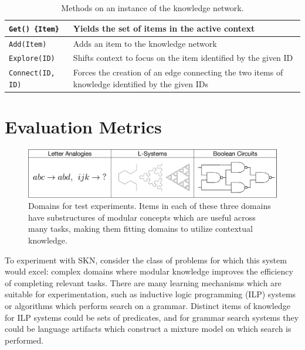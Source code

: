 \documentclass[11pt,letterpaper]{article}
\begin{document}
\begin{table}[h]
  \begin{center}
  \begin{tabular}{|l|p{4in}|}
    \hline
    {\tt Get() \{Item\}}  & Yields the set of items in the active context \\
                            \hline
    {\tt Add(Item)}       & Adds an item to the knowledge network \\ \hline
    {\tt Explore(ID)}     & Shifts context to focus on the item identified
                            by the given ID \\ \hline
    {\tt Connect(ID, ID)} & Forces the creation of an edge connecting the
                            two items of knowledge identified by the given
                            IDs \\
    \hline
  \end{tabular}
  \end{center}
\caption{Methods on an instance of the knowledge network.}
\label{tab:sf_get}
\end{table}


\section{Evaluation Metrics}

\begin{figure}[h]
\centering
\includegraphics[scale=.5]{exps.eps}
\caption{Domains for test experiments. Items in each of these three domains
  have substructures of modular concepts which are useful across many tasks,
  making them fitting domains to utilize contextual knowledge.}
\label{fig:exps}
\end{figure}

To experiment with SKN, consider the class of problems for which this system
would excel: complex domains where modular knowledge improves the efficiency
of completing relevant tasks. There are many learning mechanisms which are
suitable for experimentation, such as inductive logic programming (ILP)
systems or algorithms which perform search on a grammar. Distinct items of
knowledge for ILP systems could be sets of predicates, and for grammar
search systems they could be language artifacts which construct a mixture
model on which search is performed.
\end{document}
